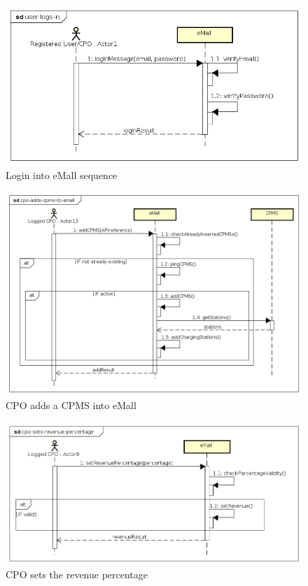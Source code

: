 \begin{figure}[!h]
    \begin{center}
        \includegraphics[keepaspectratio, width=16cm]{Sequence/user-logs-in.png}
        \caption{Login into \ac{eMall} sequence}
    \end{center}
\end{figure}
\begin{figure}[!h]
    \begin{center}
        \includegraphics[keepaspectratio, width=16cm]{Sequence/cpo-adds-cpms-to-emall.png}
        \caption{\ac{CPO} adds a \ac{CPMS} into \ac{eMall}}
    \end{center}
\end{figure}
\begin{figure}[!h]
    \begin{center}
        \includegraphics[keepaspectratio, width=16cm]{Sequence/cpo-sets-revenue-percentage.png}
        \caption{\ac{CPO} sets the revenue percentage}
    \end{center}
\end{figure}
